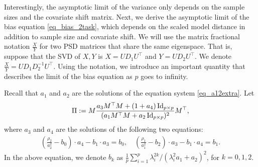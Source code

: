 Interestingly, the asymptotic limit of the variance only depends on the sample sizes and the covariate shift matrix.
Next, we derive the asymptotic limit of the bias equation \eqref{eq_bias_2task}, which depends on the scaled model distance in addition to sample size and covariate shift. %
We will use the matrix fractional notation $\frac{X}{Y}$ for two PSD matrices that share the same eigenspace.
That is, suppose that the SVD of $X, Y$ is $X = U D_1 U^{\top}$ and $Y = U D_2 U^{\top}$.
We denote $\frac{X}{Y} = U D_{1} D_2^{-1} U^{\top}$.
Using the notation, we introduce an important quantity that describes the limit of the bias equation as $p$ goes to infinity.

\begin{definition}
Recall that $a_1$ and $a_2$ are the solutions of the equation system \eqref{eq_a12extra}. Let
	\[ \Pi :=  M \frac{a_3 M^{\top}M + (1 + a_4) \operatorname{Id}_{p\times p}}{(a_1 M^{\top}M + a_2\operatorname{Id}_{p\times p})^2} M^{\top}, \]
where $a_{3}$ and $a_4$ are the solutions of the following two equations:
\begin{gather}\label{eq_a34extra}
		\left(\frac{\rho_2}{a_2^{2}}-  b_0\right)\cdot  a_4 - b_1 \cdot  a_3
		= b_0, \quad \left(\frac{\rho_1}{a_1^{2}} -  b_2  \right)\cdot  a_3 -  b_1 \cdot  a_4 = b_1 .
	\end{gather}
In the above equation, we denote $b_k$ as $\frac1{p}\sum_{i=1}^p {\lambda_i^{2k}} / { (\lambda_i^2 a_1 + a_2)^2  }$, for $k = 0, 1, 2$.
\end{definition}

